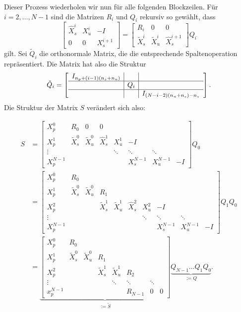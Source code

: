 Dieser Prozess wiederholen wir nun für alle folgenden Blockzeilen. Für $i=2,\hdots,N-1$ sind die Matrizen $R_i$ und $Q_i$ rekursiv so gewählt, dass
$$\left[ \begin{array}{ccc}
\hat{X}_s^i &  X_u^i & -I \\ 
0 & 0 & X_s^{i+1}
\end{array}\right]
= \left[ 
\begin{array}{ccc} 
R_i & 0 & 0 \\
\tilde{X}^i_s & \tilde{X}^i_u & \hat{X}^{i+1}_s
\end{array}\right]Q_i$$
gilt. Sei $\tilde{Q}_i$ die orthonormale Matrix, die die entsprechende Spaltenoperation repräsentiert. Die Matrix hat also die Struktur $$\tilde{Q}_i=\left[\begin{array}{c|c|c}
I_{n_p+(i-1)(n_s+n_u)} & & \\
\hline
& Q_i & \\
\hline
&&I_{(N-i-2)(n_u+n_s)-n_s}\\
\end{array}\right].$$
Die Struktur der Matrix $S$ verändert sich also:

\begin{align*}
S&=\left[\begin{array}{cccccccc}
X_p^0 & R_0 & 0 & 0 &  &  &  &  \\ 
X_p^1 & \tilde{X}_s^0 & \tilde{X}_u^0 & \hat{X}_s^1 & X_u ^1  & -I &  &  \\ 
\vdots &  &  &  & \ddots & \ddots & \ddots &  \\ 
X_p^{N-1} &  &  &  &  & X_s^{N-1} & X_u^{N-1} & -I
\end{array}  \right]Q_0 \\
&=\left[\begin{array}{cccccccccc}
X_p^0 & R_0 &  &  &  &  &  &  \\ 
X_p^1 & \tilde{X}_s^0 & \tilde{X}_u^0 & R_1 &  &  &  &  \\ 
X_p^2  & &  & \tilde{X}_s^1 & \tilde{X}_u^1 & \hat{X}_s^2 & X_u^2& -I  \\ 
\vdots &  &  & & & & \ddots & \ddots & \ddots &  \\ 
X_p^{N-1} &  &  & & & &  & X_s^{N-1} & X_u^{N-1} & -I
\end{array} \right]Q_1Q_0\\
&=\underbrace{\left[
\begin{array}{cccccccc}
X_p^0 & R_0 &  &  &  &  &  &  \\ 
X_p^1 & \tilde{X}_s^0 & \tilde{X}_u^0 & R_1 &  &  &  &  \\ 
X_p^2 &  &  & \tilde{X}_s^1 & \tilde{X}_u^1 & R_2 &  &  \\ 
\vdots &  &  &  & \ddots & \ddots & \ddots &  \\ 
x_p^{N-1} &  &  &  &  & R_{N-1} & 0 & 0
\end{array}  \right]}_{:=\tilde{S}}
\underbrace{Q_{N-1}\hdots Q_1Q_0}_{:=Q}.
\end{align*}


